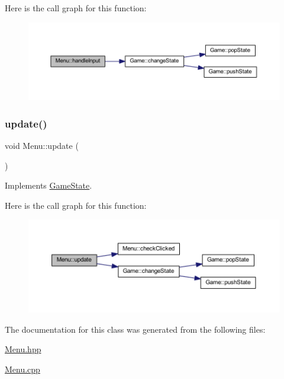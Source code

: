 Here is the call graph for this function\+:
\nopagebreak
\begin{figure}[H]
\begin{center}
\leavevmode
\includegraphics[width=350pt]{class_menu_a28296c3978c880ea9288fc97a869795d_cgraph}
\end{center}
\end{figure}
\mbox{\label{class_menu_a8446e8a1e56e9cf1db93790067510a61}} 
\subsubsection{\texorpdfstring{update()}{update()}}
{\footnotesize\ttfamily void Menu\+::update (\begin{DoxyParamCaption}{ }\end{DoxyParamCaption})\hspace{0.3cm}{\ttfamily [virtual]}}



Implements \hyperlink{class_game_state_ab2864bfa04f92f6966861a1f2883bda0}{Game\+State}.

Here is the call graph for this function\+:
\nopagebreak
\begin{figure}[H]
\begin{center}
\leavevmode
\includegraphics[width=350pt]{class_menu_a8446e8a1e56e9cf1db93790067510a61_cgraph}
\end{center}
\end{figure}


The documentation for this class was generated from the following files\+:\begin{DoxyCompactItemize}
\item 
\hyperlink{_menu_8hpp}{Menu.\+hpp}\item 
\hyperlink{_menu_8cpp}{Menu.\+cpp}\end{DoxyCompactItemize}
